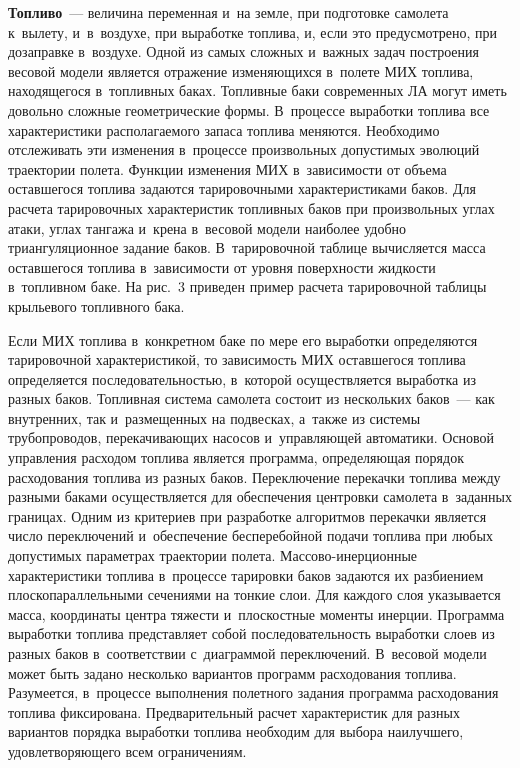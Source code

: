 \begin{multicols}{2}
  \textbf{Топливо}~--- величина переменная и~на земле, при подготовке 
самолета к~вылету, и~в~воздухе, при выработке топлива, и, если это 
предусмотрено, при дозаправке в~воздухе. Одной из самых сложных и~важных 
задач построения весовой модели является отражение изменяющихся в~полете  
МИХ топлива, находящегося 
в~топливных баках. Топливные баки современных ЛА
могут иметь довольно сложные геометрические формы. В~процессе выработки 
топлива все характеристики располагаемого запаса топлива меняются. 
Необходимо отслеживать эти изменения в~процессе произвольных допустимых 
эволюций траектории полета. Функции изменения МИХ в~зависимости от 
объема оставшегося топлива задаются тарировочными характеристиками баков. 
Для расчета тарировочных характеристик топливных баков при произвольных 
углах атаки, углах тангажа и~крена в~весовой модели наиболее удобно 
триангуляционное задание баков. В~тарировочной таблице вычисляется масса 
оставшегося топлива в~зависимости от уровня поверхности жидкости 
в~топливном баке. На рис.~3 приведен пример расчета тарировочной таблицы 
крыльевого топливного бака.



  Если МИХ топлива в~конкретном баке по 
мере его выработки определяются тарировочной характеристикой, то 
зависимость МИХ оставшегося топлива определяется последовательностью, 
в~которой осуществляется выработка из разных баков. Топливная система 
самолета состоит из нескольких баков~--- как внутренних, так и~размещенных 
на подвесках, а~также из системы трубопроводов, перекачивающих насосов и~управляющей автоматики. Основой управления расходом топлива является 
программа, определяющая порядок расходования топлива из разных баков. 
Переключение перекачки топлива между разными баками осуществляется для 
обеспечения центровки самолета в~заданных границах. Одним из критериев при 
разработке алгоритмов перекачки является число переключений и~обеспечение 
бесперебойной подачи топлива при любых допустимых параметрах траектории 
полета. Массово-инерционные характеристики топлива в~процессе тарировки 
баков задаются их разбиением плоскопараллельными сечениями на тонкие 
слои. Для каждого слоя указывается масса, координаты центра тяжести 
и~плоскостные моменты инерции. Программа выработки топлива пред\-став\-ля\-ет 
собой последовательность выработки слоев из разных баков в~соответствии 
с~диаграммой переключений. В~весовой модели может быть задано несколько 
вариантов программ расходования топлива. Разумеется, в~процессе выполнения 
полетного задания программа расходования топлива фиксирована. 
Предварительный расчет характеристик для разных вариантов порядка 
выработки топлива необходим для выбора наилучшего, удовле\-тво\-ря\-юще\-го 
всем ограничениям.
  

\end{multicols}

